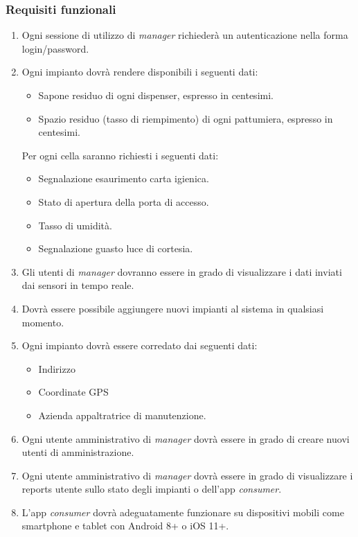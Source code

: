 \documentclass[12pt]{article}
\begin{document}
\subsubsection{Requisiti funzionali}
\begin{enumerate}

\item Ogni sessione di utilizzo di \textit{manager} richiederà un autenticazione nella forma login/password.
\item Ogni impianto dovrà rendere disponibili i seguenti dati:
\begin{itemize}
\item Sapone residuo di ogni dispenser, espresso in centesimi.
\item Spazio residuo (tasso di riempimento) di ogni pattumiera, espresso in centesimi.
\end{itemize}
Per ogni cella saranno richiesti i seguenti dati:
\begin{itemize}
\item Segnalazione esaurimento carta igienica.
\item Stato di apertura della porta di accesso.
\item Tasso di umidità.
\item Segnalazione guasto luce di cortesia.
\end{itemize}
\item Gli utenti di \textit{manager} dovranno essere in grado di visualizzare i dati inviati dai sensori in tempo reale.
\item Dovrà essere possibile aggiungere nuovi impianti al sistema in qualsiasi momento.
\item Ogni impianto dovrà essere corredato dai seguenti dati:
\begin{itemize}
\item Indirizzo
\item Coordinate GPS
\item Azienda appaltratrice di manutenzione.
\end{itemize}
\item Ogni utente amministrativo di \textit{manager} dovrà essere in grado di creare nuovi utenti di amministrazione.
\item Ogni utente amministrativo di \textit{manager} dovrà essere in grado di visualizzare i reports utente sullo stato degli impianti o dell'app \textit{consumer}.
\item L'app \textit{consumer} dovrà adeguatamente funzionare su dispositivi mobili come smartphone e tablet con Android 8+ o iOS 11+.

\end{enumerate}
\end{document}
